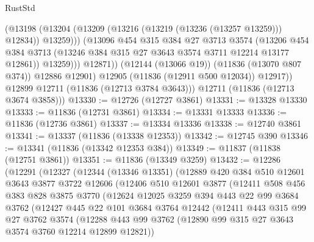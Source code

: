 \begin{lexlean}{RustStd}
\begin{coremodule}
                        (@13198
                          (@13204
                            (@13209 (@13216 (@13219 (@13236 (@13257 @13259))) @12834))
                            @13259)))
                      (@13096
                        @454
                        @315
                        @384
                        @27
                        @3713
                        @3574
                        (@13206
                          @454
                          @384
                          @3713
                          (@13246 @384 @315 @27 @3643 @3574 @3711 @12214 @13177 @12861))
                        @13259)))
                  @12871))
              (@12144 (@13066 @19))
              (@11836 (@13070 @807 @374))
              @12886
              @12901)
            @12905
            (@11836 (@12911 @500 @12034))
            @12917))
        @12899
        @12711
        (@11836 (@12713 @3784 @3643)))
      @12711
      (@11836 (@12713 @3674 @3858)))
@13330 := @12726 (@12727 @3861)
@13331 := @13328 @13330
@13333 := @11836 (@12731 @3861)
@13334 := @13331 @13333
@13336 := @11836 (@12736 @3861)
@13337 := @13334 @13336
@13338 := @12740 @3861
@13341 := @13337 (@11836 (@13338 @12353))
@13342 := @12745 @390
@13346 := @13341 (@11836 (@13342 @12353 @384))
@13349 := @11837 (@11838 (@12751 @3861))
@13351 := @11836 (@13349 @3259)
@13432 := @12286
    (@12291
      (@12327
        (@12344
          (@13346 @13351)
          (@12889
            @420
            @384
            @510
            @12601
            @3643
            @3877
            @3722
            @12606
            (@12406
              @510
              @12601
              @3877
              (@12411
                @508
                @456
                @383
                @828
                @3875
                @3770
                (@12624
                  @12025
                  @3259
                  @394
                  @443
                  @22
                  @99
                  @3684
                  @3762
                  (@12427
                    @445
                    @22
                    @101
                    @3684
                    @3764
                    @12442
                    (@12411
                      @443
                      @315
                      @99
                      @27
                      @3762
                      @3574
                      (@12288
                        @443
                        @99
                        @3762
                        (@12890 @99 @315 @27 @3643 @3574 @3760 @12214 @12899 @12821))

\end{coremodule}
\end{lexlean}
